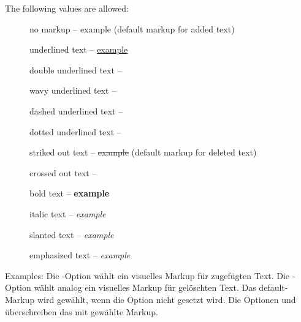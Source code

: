 The following values are allowed:
\begin{description}
	\item [] no markup -- example (default markup for added text)
	\item [] underlined text -- \uline{example}
	\item [] double underlined text -- 
	\item [] wavy underlined text -- 
	\item [] dashed underlined text -- 
	\item [] dotted underlined text -- 
	\item [] striked out text -- \sout{example} (default markup for deleted text)
	\item [] crossed out text -- 
	\item [] bold text -- \textbf{example}
	\item [] italic text -- \textit{example}
	\item [] slanted text -- \textsl{example}
	\item [] emphasized text -- \emph{example}
\end{description}

Examples:
\fi
\ifGERMAN
	Die -Option wählt ein visuelles Markup für zugefügten Text.
	Die -Option wählt analog ein visuelles Markup für gelöschten Text.
	Das default-Markup wird gewählt, wenn die Option nicht gesetzt wird.
	Die Optionen  und  überschreiben das mit  gewählte Markup.

